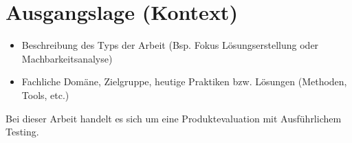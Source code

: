 \section{Ausgangslage (Kontext)}

\begin{itemize}	
	\item Beschreibung des Typs der Arbeit (Bsp. Fokus Lösungserstellung oder Machbarkeitsanalyse)
	\item Fachliche Domäne, Zielgruppe, heutige Praktiken bzw. Lösungen (Methoden, Tools, etc.)
\end{itemize}

Bei dieser Arbeit handelt es sich um eine Produktevaluation mit Ausführlichem Testing. 